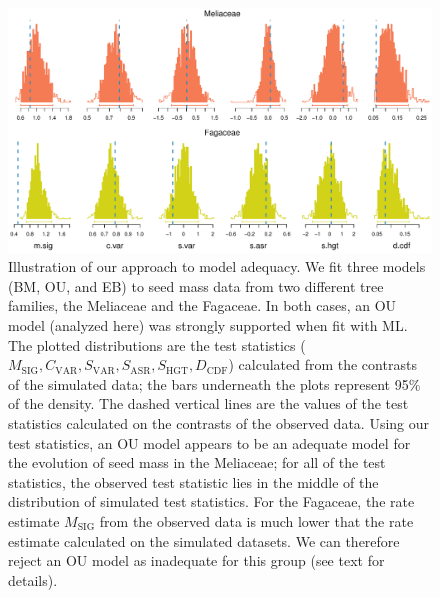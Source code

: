 \documentclass[a4paper,11pt]{article}
\begin{document}
\begin{figure}[p]
  \centering
  \includegraphics[scale=0.65]{figs/two-clades}
  \caption{Illustration of our approach to model adequacy. We fit three models (BM, OU, and EB) to seed mass data from two different tree families, the Meliaceae and the Fagaceae. In both cases, an OU model (analyzed here) was strongly supported when fit with ML. The plotted distributions are the test statistics ($M_{\text{SIG}}, C_{\text{VAR}}, S_{\text{VAR}}, S_{\text{ASR}}, S_{\text{HGT}}, D_{\text{CDF}}$) calculated from the contrasts of the simulated data; the bars underneath the plots represent 95\% of the density. The dashed vertical lines are the values of the test statistics calculated on the contrasts of the observed data. Using our test statistics, an OU model appears to be an adequate model for the evolution of seed mass in the Meliaceae; for all of the test statistics, the observed test statistic lies in the middle of the distribution of simulated test statistics. For the Fagaceae, the rate estimate $M_{\text{SIG}}$ from the observed data is much lower that the rate estimate calculated on the simulated datasets. We can therefore reject an OU model as inadequate for this group (see text for details).}
  \label{fig:two-clades}
\end{figure}
\end{document}
